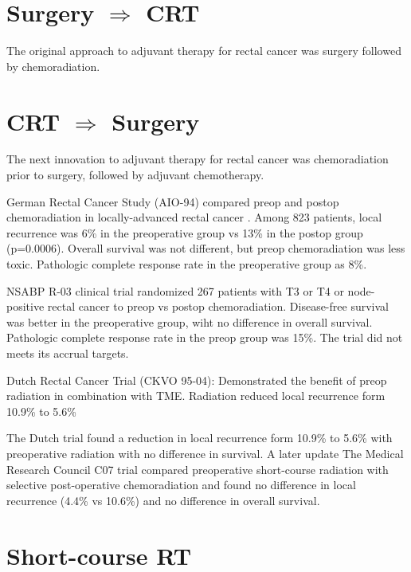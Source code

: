\documentclass[
]{book}
\begin{document}
\hypertarget{surgery-rightarrow-crt}{%
\section{\texorpdfstring{Surgery \(\Rightarrow\) CRT}{Surgery \textbackslash Rightarrow CRT}}\label{surgery-rightarrow-crt}}

The original approach to adjuvant therapy for rectal cancer was surgery followed by chemoradiation.

\hypertarget{crt-rightarrow-surgery}{%
\section{\texorpdfstring{CRT \(\Rightarrow\) Surgery}{CRT \textbackslash Rightarrow Surgery}}\label{crt-rightarrow-surgery}}

The next innovation to adjuvant therapy for rectal cancer was chemoradiation prior to surgery, followed by adjuvant chemotherapy.

German Rectal Cancer Study (AIO-94) compared preop and postop chemoradiation in locally-advanced rectal cancer \citep{sauer173}. Among 823 patients, local recurrence was 6\% in the preoperative group vs 13\% in the postop group (p=0.0006). Overall survival was not different, but preop chemoradiation was less toxic. Pathologic complete response rate in the preoperative group as 8\%.

NSABP R-03 clinical trial \citep{roh5124} randomized 267 patients with T3 or T4 or node-positive rectal cancer to preop vs postop chemoradiation. Disease-free survival was better in the preoperative group, wiht no difference in overall survival. Pathologic complete response rate in the preop group was 15\%. The trial did not meets its accrual targets.

Dutch Rectal Cancer Trial (CKVO 95-04): Demonstrated the benefit of preop radiation in combination with TME\citep{kapiteijn638}. Radiation reduced local recurrence form 10.9\% to 5.6\%

The Dutch trial found a reduction in local recurrence form 10.9\% to 5.6\% with preoperative radiation with no difference in survival\citep{kapiteijn638}. A later update\citep{vangijn575} The Medical Research Council C07 trial compared preoperative short-course radiation with selective post-operative chemoradiation and found no difference in local recurrence (4.4\% vs 10.6\%) and no difference in overall survival.\citep{sebag-montefiore811}

\hypertarget{short-course-rt}{%
\section{Short-course RT}\label{short-course-rt}}
\end{document}
